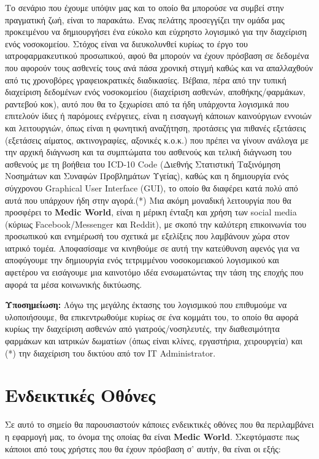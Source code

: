 \documentclass{article}
\begin{document}
Το σενάριο που έχουμε υπόψιν μας και το οποίο θα μπορούσε να συμβεί στην πραγματική ζωή, είναι το παρακάτω. Ένας πελάτης προσεγγίζει την ομάδα μας προκειμένου να δημιουργήσει ένα εύκολο και εύχρηστο λογισμικό για την διαχείριση ενός νοσοκομείου. Στόχος είναι να διευκολυνθεί κυρίως το έργο του ιατροφαρμακευτικού προσωπικού, αφού θα μπορούν να έχουν πρόσβαση σε δεδομένα που αφορούν τους ασθενείς τους ανά πάσα χρονική στιγμή καθώς και να απαλλαχθούν από τις χρονοβόρες γραφειοκρατικές διαδικασίες. Βέβαια, πέρα από την τυπική διαχείριση δεδομένων ενός νοσοκομείου (διαχείριση ασθενών, αποθήκης/φαρμάκων, ραντεβού κοκ), αυτό που θα το ξεχωρίσει από τα ήδη υπάρχοντα λογισμικά που επιτελούν ίδιες ή παρόμοιες ενέργειες, είναι η εισαγωγή κάποιων καινούργιων εννοιών και λειτουργιών, όπως είναι η φωνητική αναζήτηση, προτάσεις για πιθανές εξετάσεις (εξετάσεις αίματος, ακτινογραφίες, αξονικές κ.ο.κ.) που πρέπει να γίνουν ανάλογα με την αρχική διάγνωση και τα συμπτώματα του ασθενούς και τελική διάγνωση του ασθενούς με τη βοήθεια του ICD-10 Code (Διεθνής Στατιστική Ταξινόμηση Νοσημάτων και Συναφών Προβλημάτων Υγείας), καθώς και η δημιουργία ενός σύγχρονου Graphical User Interface (GUI), το οποίο θα διαφέρει κατά πολύ από αυτά που υπάρχουν ήδη στην αγορά.(*) Μια ακόμη μοναδική λειτουργία που θα προσφέρει το \textbf{Medic World}, είναι η μέρικη ένταξη και χρήση των social media (κύριως Facebook/Messenger και Reddit), με σκοπό την καλύτερη επικοινωνία του προσωπικού και ενημέρωσή του σχετικά με εξελίξεις που λαμβάνουν χώρα στον ιατρικό τομέα. Αποφασίσαμε να κινηθούμε σε αυτή την κατεύθυνση αφενός για να αποφύγουμε την δημιουργία ενός τετριμμένου νοσοκομειακού λογισμικού και αφετέρου να εισάγουμε μια καινοτόμο ιδέα ενσωματώντας την τάση της εποχής που αφορά τα μέσα κοινωνικής δικτύωσης.
\newline \par
\textbf{Υποσημείωση:} Λόγω της μεγάλης έκτασης του λογισμικού που επιθυμούμε να υλοποιήσουμε, θα επικεντρωθούμε κυρίως σε ένα κομμάτι του, το οποίο θα αφορά κυρίως την διαχείριση ασθενών από γιατρούς/νοσηλευτές, την διαθεσιμότητα φαρμάκων και ιατρικών δωματίων (όπως είναι κλίνες, εργαστήρια, χειρουργεία) και (*) την διαχείριση του δικτύου από τον IT Administrator.


\section{Ενδεικτικές Οθόνες}

Σε αυτό το σημείο θα παρουσιαστούν κάποιες ενδεικτικές οθόνες που θα περιλαμβάνει η εφαρμογή μας, το όνομα της οποίας θα είναι \textbf{Medic World}. Σκεφτόμαστε πως κάποιοι από τους χρήστες που θα έχουν πρόσβαση σ' αυτήν, θα είναι οι εξής:
\end{document}
